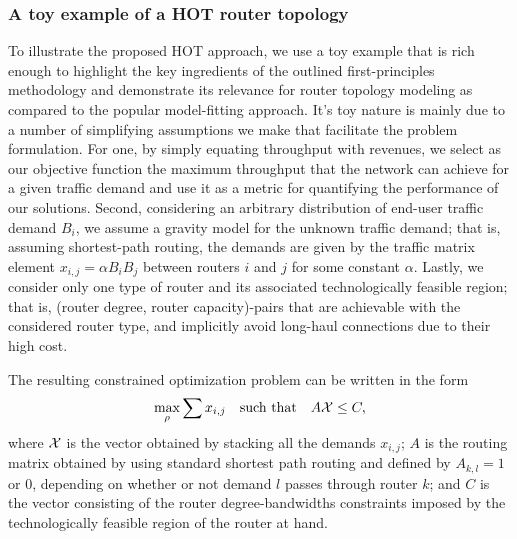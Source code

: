 \subsubsection{A toy example of a HOT router topology}

To illustrate the proposed HOT approach, we use a toy example that is
rich enough to highlight the key ingredients of the outlined
first-principles methodology and demonstrate its relevance for router
topology modeling as compared to the popular model-fitting approach.
It's toy nature is mainly due to a number of simplifying assumptions
we make that facilitate the problem formulation. For one, by simply
equating throughput with revenues, we select as our objective function
the maximum throughput that the network can achieve for a given
traffic demand and use it as a metric for quantifying the performance
of our solutions. Second, considering an arbitrary distribution of
end-user traffic demand $B_i$, we assume a gravity model for the
unknown traffic demand; that is, assuming shortest-path routing, the
demands are given by the traffic matrix element $x_{i,j} = \alpha B_i
B_j$ between routers $i$ and $j$ for some constant $\alpha$. Lastly,
we consider only one type of router and its associated technologically
feasible region; that is, (router degree, router capacity)-pairs that
are achievable with the considered router type, and implicitly avoid
long-haul connections due to their high cost.

The resulting constrained optimization problem can be written in the
form
\begin{equation}
   \max_{\rho} \sum x_{i,j} \mbox{~~~such~that~~~} A {\cal X} \leq C,
\end{equation}
where ${\cal X}$ is the vector obtained by stacking all the demands
$x_{i,j}$; $A$ is the routing matrix obtained by using standard
shortest path routing and defined by $A_{k,l} = 1$ or 0, depending on
whether or not demand $l$ passes through router $k$; and $C$ is the
vector consisting of the router degree-bandwidths constraints imposed
by the technologically feasible region of the router at hand.

